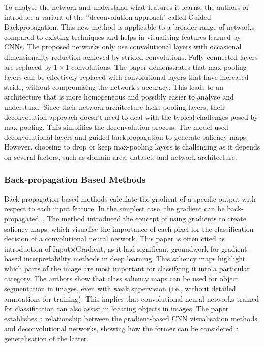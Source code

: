 To analyse the network and understand what features it learns, the authors of~\cite{SpringenbergDBR14} introduce a variant of the ``deconvolution approach" called Guided Backpropagation. This new method is applicable to a broader range of networks compared to existing techniques and helps in visualising features learned by CNNs. The proposed networks only use convolutional layers with occasional dimensionality reduction achieved by strided convolutions. Fully connected layers are replaced by $1\times 1$ convolutions. The paper demonstrates that max-pooling layers can be effectively replaced with convolutional layers that have increased stride, without compromising the network's accuracy. This leads to an architecture that is more homogeneous and possibly easier to analyse and understand. Since their network architecture lacks pooling layers, their deconvolution approach doesn't need to deal with the typical challenges posed by max-pooling. This simplifies the deconvolution process. The model used deconvolutional layers and guided backpropagation to generate saliency maps. However, choosing to drop or keep max-pooling layers is challenging as it depends on several factors, such as domain area, dataset, and network architecture. 

\subsubsection{Back-propagation Based Methods}

Back-propagation based methods calculate the gradient of a specific output with respect to each input feature. In the simplest case, the gradient can be back-propagated~\cite{SimonyanVZ13}. The method introduced the concept of using gradients to create saliency maps, which visualise the importance of each pixel for the classification decision of a convolutional neural network. This paper is often cited as introduction of Input$\times$Gradient, as it laid significant groundwork for gradient-based interpretability methods in deep learning. This saliency maps highlight which parts of the image are most important for classifying it into a particular category. The authors show that class saliency maps can be used for object segmentation in images, even with weak supervision (i.e., without detailed annotations for training). This implies that convolutional neural networks trained for classification can also assist in locating objects in images. The paper establishes a relationship between the gradient-based CNN visualisation methods and deconvolutional networks, showing how the former can be considered a generalisation of the latter.


